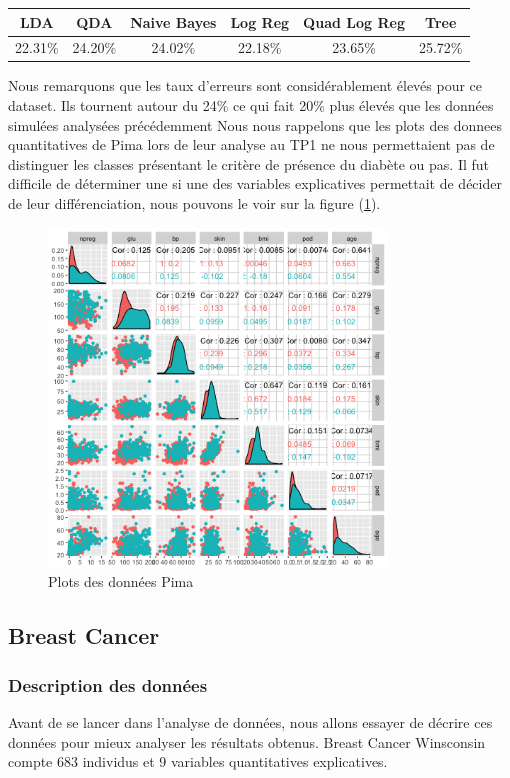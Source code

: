 \documentclass[10pt]{article}
\begin{document}
\begin{center}
	\begin{tabular}{|c | c | c| c| c| c|}
		\hline
		LDA & QDA & Naive Bayes & Log Reg & Quad Log Reg & Tree\\
		\hline	
		22.31\% & 24.20\% & 24.02\% & 22.18\% & 23.65\% & 25.72\%
	\end{tabular}
\end{center}

Nous remarquons que les taux d'erreurs sont considérablement élevés pour ce dataset. Ils tournent autour du 24\% ce qui fait 20\% plus élevés que les données simulées analysées précédemment Nous nous rappelons que les plots des donnees quantitatives de Pima lors de leur analyse au TP1 ne nous permettaient pas de distinguer les classes présentant le critère de présence du diabète ou pas. Il fut difficile de déterminer une si une des variables explicatives permettait de décider de leur différenciation, nous pouvons le voir sur la figure (\ref{fig:plotPima}). 
\begin{figure}[H]
	\centering
	\includegraphics[width=9cm]{Figures/plot_Pimaquant.png}%
	\caption{Plots des données Pima}%
	\label{fig:plotPima}
\end{figure}

\subsection{Breast Cancer}
\subsubsection{Description des données}
Avant de se lancer dans l'analyse de données, nous allons essayer de décrire ces données pour mieux analyser les résultats obtenus. Breast Cancer Winsconsin compte 683 individus et 9 variables quantitatives explicatives.
\end{document}
